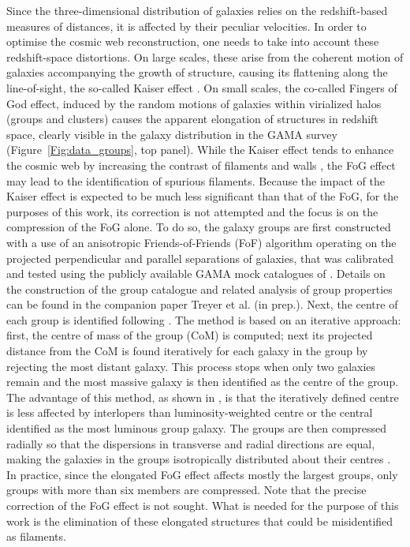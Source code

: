 \documentclass[useAMS,usenatbib]{mnras}
\newcommand{\fof}{FoF\xspace}
\newcommand{\fog}{FoG\xspace}
\newcommand{\com}{CoM\xspace}
\begin{document}
Since the three-dimensional distribution of galaxies relies on the redshift-based measures of distances, it is affected by their peculiar velocities.  
In order to optimise the cosmic web reconstruction, one needs to take into account these redshift-space distortions. On large scales, these arise from the coherent motion of galaxies accompanying the growth of structure, causing its flattening along the line-of-sight, the so-called Kaiser effect \citep{Kaiser1987}. On small scales, the co-called Fingers of God \cite[FOG;][]{Jackson1972,Tully1978} effect, induced by the random motions of galaxies within virialized halos (groups and clusters) causes the apparent elongation of structures in redshift space, clearly visible in the galaxy distribution in the GAMA survey (Figure~\ref{Fig:data_groups}, top panel). 
While the Kaiser effect tends to enhance the cosmic web by increasing the contrast of filaments and walls \cite[e.g.][]{SubbaRao2008,Shi2016}, the \fog effect may lead to the identification of spurious filaments. Because the impact of the Kaiser effect is expected to be much less significant than that of the \fog \cite[e.g.][]{SubbaRao2008,Kuutma2017}, for the purposes of this work, its correction is not attempted and the focus is on the compression of the \fog alone. 
To do so, the galaxy groups are first constructed with a use of an anisotropic Friends-of-Friends (\fof) algorithm operating on the projected perpendicular and parallel separations of galaxies, 
that was calibrated and tested using the publicly available GAMA mock catalogues of \cite{Robotham2011} \citep[see also][for details of the mock catalogues construction]{Merson2013}. Details on the construction of the group catalogue and related analysis of group properties can be found in the companion paper Treyer et al. (in prep.). 
Next, the centre of each group is identified following \cite{Robotham2011} \citep[see also][for a different implementation]{Eke2004}. The method is based on an iterative approach: first, the centre of mass of the group (\com) is computed; next its projected distance from the \com  is found iteratively for each galaxy in the group by rejecting the most distant galaxy. This process stops when only two galaxies remain and the most massive galaxy is then identified as the centre of the group.  
The advantage of this method, as shown in \cite{Robotham2011}, is that the iteratively defined centre is less affected by interlopers than luminosity-weighted centre or the central identified as the most luminous group galaxy. The groups are then compressed radially so that the dispersions in transverse and radial directions are equal, making the galaxies in the groups isotropically distributed about their centres \citep[see e.g.][]{Tegmark2004}. 
In practice, since the elongated \fog effect affects mostly the largest groups, only groups with more than six members are compressed.
Note that the precise correction of the \fog effect is not sought. What is needed for the purpose of this work is the elimination of these elongated structures that could be misidentified as filaments.
\end{document}
